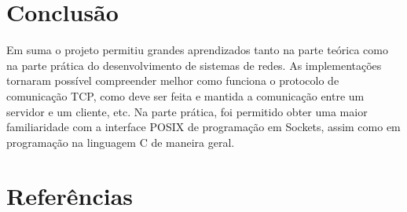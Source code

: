 \documentclass{article}
\begin{document}
\section{Conclusão}

Em suma o projeto permitiu grandes aprendizados tanto na parte teórica como na
parte prática do desenvolvimento de sistemas de redes. As implementações
tornaram
possível compreender melhor como funciona o protocolo de comunicação TCP, como
deve ser feita e mantida a comunicação entre um servidor e um cliente, etc. Na
parte prática, foi permitido obter uma maior familiaridade
com a interface POSIX de programação em Sockets, assim como em programação na
linguagem C de maneira geral.

\section{Referências}
\end{document}
